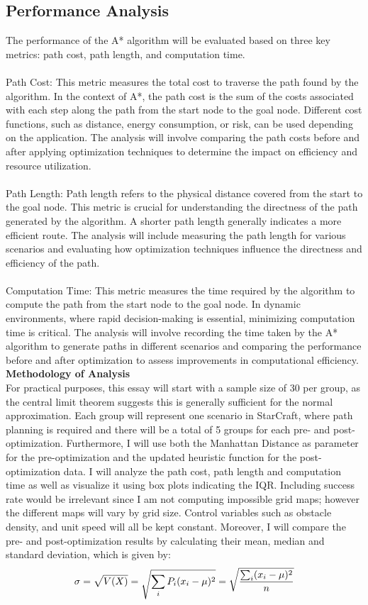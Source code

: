 \documentclass[12pt]{article}
\begin{document}
\subsection{Performance Analysis}
The performance of the A* algorithm will be evaluated based on three key metrics: path cost, path length, and computation time.
\\\\
Path Cost: This metric measures the total cost to traverse the path found by the algorithm. In the context of A*, the path cost is the sum of the costs associated with each step along the path from the start node to the goal node. Different cost functions, such as distance, energy consumption, or risk, can be used depending on the application. The analysis will involve comparing the path costs before and after applying optimization techniques to determine the impact on efficiency and resource utilization.
\\\\
Path Length: Path length refers to the physical distance covered from the start to the goal node. This metric is crucial for understanding the directness of the path generated by the algorithm. A shorter path length generally indicates a more efficient route. The analysis will include measuring the path length for various scenarios and evaluating how optimization techniques influence the directness and efficiency of the path.
\\\\
Computation Time: This metric measures the time required by the algorithm to compute the path from the start node to the goal node. In dynamic environments, where rapid decision-making is essential, minimizing computation time is critical. The analysis will involve recording the time taken by the A* algorithm to generate paths in different scenarios and comparing the performance before and after optimization to assess improvements in computational efficiency.
\newpage
\textbf{Methodology of Analysis}
\\
For practical purposes, this essay will start with a sample size of 30 per group, as the central limit theorem suggests this is generally sufficient for the normal approximation. Each group will represent one scenario in StarCraft, where path planning is required and there will be a total of 5 groups for each pre- and post-optimization. Furthermore, I will use both the Manhattan Distance as parameter for the pre-optimization and the updated heuristic function for the post-optimization data. I will analyze the path cost, path length and computation time as well as visualize it using box plots indicating the IQR. Including success rate would be irrelevant since I am not computing impossible grid maps; however the different maps will vary by grid size. Control variables such as obstacle density, and unit speed will all be kept constant.  Moreover, I will compare the pre- and post-optimization results by calculating their mean, median and standard deviation, which is given by: \\
\[
\sigma=\sqrt{V(X)}=\sqrt{\sum_{i} P_{i}(x_{i} - \mu)^2}=\sqrt{\frac{\sum_{i} (x_{i} - \mu)^2}{n}} \\ 
\]
\end{document}
